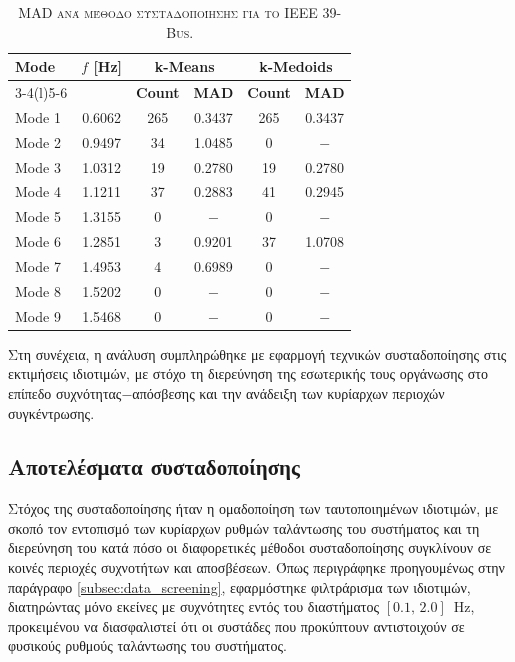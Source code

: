 \documentclass[conference]{IEEEtran}
\begin{document}
\begin{table}[!t]
\centering
\caption{\textsc{MAD ανά μέθοδο συσταδοποίησης για το IEEE 39-Bus.}}
\label{tab:mad_summary_ieee39}
\small
\renewcommand{\arraystretch}{1.2}
\setlength{\tabcolsep}{4pt}
\begin{tabular}{lccccc}
\toprule
\textbf{Mode} & \textbf{$f$ [Hz]} & \multicolumn{2}{c}{\textbf{k-Means}} & \multicolumn{2}{c}{\textbf{k-Medoids}} \\
\cmidrule(lr){3-4}\cmidrule(l){5-6}
 & & \textbf{Count} & \textbf{MAD} & \textbf{Count} & \textbf{MAD} \\
\midrule
Mode 1 & 0.6062 & 265 & 0.3437 & 265 & 0.3437 \\
Mode 2 & 0.9497 & 34  & 1.0485 & 0   & $-$     \\
Mode 3 & 1.0312 & 19  & 0.2780 & 19  & 0.2780 \\
Mode 4 & 1.1211 & 37  & 0.2883 & 41  & 0.2945 \\
Mode 5 & 1.3155 & 0   & $-$     & 0   & $-$     \\
Mode 6 & 1.2851 & 3   & 0.9201 & 37  & 1.0708 \\
Mode 7 & 1.4953 & 4   & 0.6989 & 0   & $-$     \\
Mode 8 & 1.5202 & 0   & $-$     & 0   & $-$     \\
Mode 9 & 1.5468 & 0   & $-$     & 0   & $-$     \\
\bottomrule
\end{tabular}
\end{table}

Στη συνέχεια, η ανάλυση συμπληρώθηκε με εφαρμογή τεχνικών συσταδοποίησης στις
εκτιμήσεις ιδιοτιμών, με στόχο τη διερεύνηση της εσωτερικής τους οργάνωσης στο επίπεδο
συχνότητας$-$απόσβεσης και την ανάδειξη των κυρίαρχων περιοχών συγκέντρωσης.


\subsection{Αποτελέσματα συσταδοποίησης}

Στόχος της συσταδοποίησης ήταν η ομαδοποίηση των ταυτοποιημένων ιδιοτιμών, με σκοπό τον εντοπισμό των κυρίαρχων ρυθμών ταλάντωσης του συστήματος και τη διερεύνηση του κατά πόσο οι διαφορετικές μέθοδοι συσταδοποίησης συγκλίνουν σε κοινές περιοχές συχνοτήτων και αποσβέσεων. Όπως περιγράφηκε προηγουμένως στην παράγραφο \ref{subsec:data_screening}, εφαρμόστηκε φιλτράρισμα των ιδιοτιμών, διατηρώντας μόνο εκείνες με συχνότητες εντός του διαστήματος $[0.1,\,2.0]$~Hz, προκειμένου να διασφαλιστεί ότι οι συστάδες που προκύπτουν αντιστοιχούν σε φυσικούς ρυθμούς ταλάντωσης του συστήματος.
\end{document}
